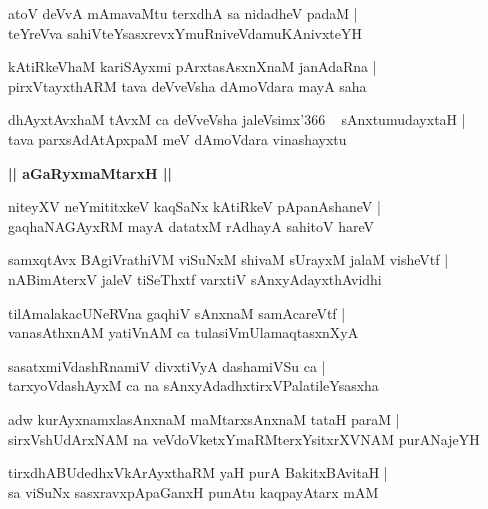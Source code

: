 \documentclass[twoside,12pt,openright]{book}
\newcounter{shloka}[chapter]
\def\uvaca#1{\centerline{{\large\textbf{#1}}}}
\begin{document}
\begin{shloka}%
atoV deVvA mAmavaMtu terxdhA sa nidadheV padaM |\\
teYreVva sahiVteYsasxrevxYmuRniveVdamuKAnivxteYH 
\end{shloka}

\begin{shloka}%
kAtiRkeVhaM kariSAyxmi pArxtasAsxnXnaM janAdaRna |\\
pirxVtayxthARM tava deVveVsha dAmoVdara mayA saha 
\end{shloka}

\begin{shloka}%
dhAyxtAvxhaM tAvxM ca deVveVsha jaleVsimx\char'366 ~ sAnxtumudayxtaH |\\
tava parxsAdAtApxpaM meV dAmoVdara vinashayxtu
\end{shloka}

\uvaca{|| aGaRyxmaMtarxH ||}

\begin{shloka}%
niteyXV neYmititxkeV kaqSaNx kAtiRkeV pApanAshaneV |\\
gaqhaNAGAyxRM mayA datatxM rAdhayA sahitoV hareV 
\end{shloka}

\begin{shloka}%
samxqtAvx BAgiVrathiVM viSuNxM shivaM sUrayxM jalaM visheVtf |\\
nABimAterxV jaleV tiSeThxtf varxtiV sAnxyAdayxthAvidhi
\end{shloka}

\begin{shloka}%
tilAmalakacUNeRVna gaqhiV sAnxnaM samAcareVtf |\\
vanasAthxnAM yatiVnAM ca tulasiVmUlamaqtasxnXyA 
\end{shloka}

\begin{shloka}%
sasatxmiVdashRnamiV divxtiVyA dashamiVSu ca |\\
tarxyoVdashAyxM ca na sAnxyAdadhxtirxVPalatileYsasxha 
\end{shloka}

\begin{shloka}%
adw kurAyxnamxlasAnxnaM maMtarxsAnxnaM tataH paraM |\\
sirxVshUdArxNAM na veVdoVketxYmaRMterxYsitxrXVNAM purANajeYH
\end{shloka}

\begin{shloka}%
tirxdhABUdedhxVkArAyxthaRM yaH purA BakitxBAvitaH |\\
sa viSuNx sasxravxpApaGanxH punAtu kaqpayAtarx mAM 
\end{shloka}
\end{document}
